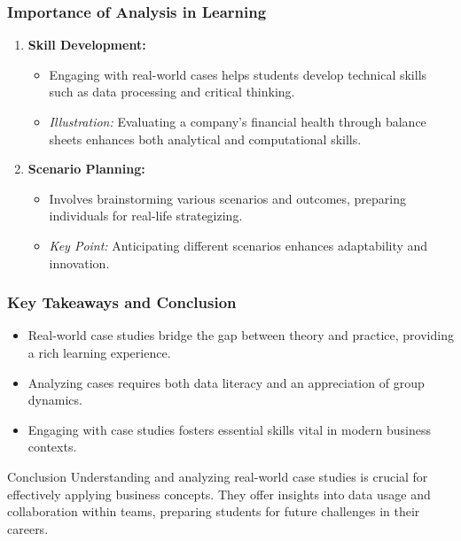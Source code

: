 \documentclass[aspectratio=169]{beamer}
\begin{document}
\begin{frame}[fragile]
    \frametitle{Importance of Analysis in Learning}
    \begin{enumerate}
        \item \textbf{Skill Development:}
        \begin{itemize}
            \item Engaging with real-world cases helps students develop technical skills such as data processing and critical thinking.
            \item \textit{Illustration:} Evaluating a company's financial health through balance sheets enhances both analytical and computational skills.
        \end{itemize}
        
        \item \textbf{Scenario Planning:}
        \begin{itemize}
            \item Involves brainstorming various scenarios and outcomes, preparing individuals for real-life strategizing.
            \item \textit{Key Point:} Anticipating different scenarios enhances adaptability and innovation.
        \end{itemize}
    \end{enumerate}
\end{frame}

\begin{frame}[fragile]
    \frametitle{Key Takeaways and Conclusion}
    \begin{itemize}
        \item Real-world case studies bridge the gap between theory and practice, providing a rich learning experience.
        \item Analyzing cases requires both data literacy and an appreciation of group dynamics.
        \item Engaging with case studies fosters essential skills vital in modern business contexts.
    \end{itemize}
    \begin{block}{Conclusion}
        Understanding and analyzing real-world case studies is crucial for effectively applying business concepts. They offer insights into data usage and collaboration within teams, preparing students for future challenges in their careers.
    \end{block}
\end{frame}
\end{document}
